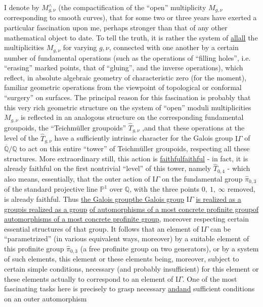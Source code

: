 \documentclass[11pt,a4paper]{article}
\let\TextUline\uline
\renewcommand{\uline}[1]{\ifmmode\underline{#1}\else\TextUline{#1}\fi}
\begin{document}
I denote by $M^{\wedge}_{g,\nu}$ (the compactification of the ``open'' multiplicity
$M_{g,\nu}$ corresponding to smooth curves), that for some two
or three years have exerted a particular fascination upon me,
perhaps stronger than that of any other mathematical object to date.
To tell the truth, it is rather the system of \uline{all} the multiplicities
$M_{g,\nu}$ for varying $g,\nu$, connected with one another by a certain number
of fundamental operations (such as the operations of ``filling
holes'', i.e. ``erasing'' marked points, that of ``gluing'',
and the inverse operations), which reflect, in absolute algebraic
geometry of characteristic zero (for the moment), familiar geometric
operations from the viewpoint of topological or conformal ``surgery''
on surfaces. The principal reason for this fascination is probably
that this very rich geometric structure on the
system of ``open'' moduli multiplicities $M_{g,\nu}$ is reflected
in an analogous structure on the corresponding fundamental
groupoids, the ``Teichmüller groupoids'' $\hat{T}_{g,\nu}$ ,and that these operations
at the level of the $\hat{T}_{g,\nu}$ have a sufficiently intrinsic character
for the Galois group $\mathrm{I}\!\Gamma$ of $\overline{\mathbb{Q}}/\mathbb{Q}$ to act on this entire ``tower'' of
Teichmüller groupoids, respecting all these structures. More
extraordinary still, this action is \uline{faithful} - in fact,
it is already faithful on the first nontrivial ``level'' of this tower,
namely $\hat{T}_{0,4}$ - which also means, essentially, that the outer
action of $\mathrm{I}\!\Gamma$ on the fundamental group $\hat{\pi}_{0,3}$ of the standard
projective line $\mathbb{P}^1$ over $\mathbb{Q}$, with the three points $0,\ 1,\ \infty$ removed, is
already faithful. Thus \uline{the Galois group} $\mathrm{I}\!\Gamma$ \uline{is realized as a group}
\uline{of automorphisms of a most concrete profinite group}, moreover respecting
certain essential structures of that group. It follows
that an element of $\mathrm{I}\!\Gamma$ can be ``parametrized'' (in various equivalent
ways, moreover) by a suitable element of this profinite group
$\hat{\pi}_{0,3}$ (a free profinite group on two generators), or by a system
of such elements, this element or these elements being, moreover, subject
to certain simple conditions, necessary (and probably insufficient)
for this element or these elements actually to correspond to an element of $\mathrm{I}\!\Gamma$.
One of the most fascinating tasks here is precisely to grasp
necessary \uline{and} sufficient conditions on an outer automorphism
\end{document}
